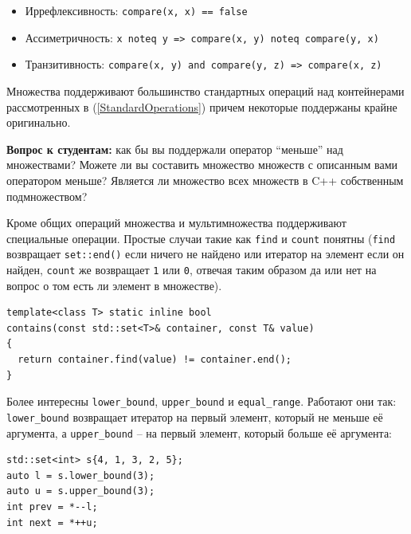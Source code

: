 \documentclass[a4paper,12pt,oneside]{article}
\newif\ifanswers
\begin{document}
\begin {itemize}
\item Иррефлексивность: \lstinline!compare(x, x) == false!
\item Ассиметричность: \lstinline!x noteq y => compare(x, y) noteq compare(y, x)!
\item Транзитивность: \lstinline!compare(x, y) and compare(y, z) => compare(x, z)!
\end {itemize}

Множества поддерживают большинство стандартных операций над контейнерами рассмотренных в (\ref{StandardOperations}) причем некоторые поддержаны крайне оригинально.

\textbf{Вопрос к студентам:} как бы вы поддержали оператор ``меньше'' над множествами? Можете ли вы составить множество множеств с описанным вами оператором меньше? Является ли множество всех множеств в C++ собственным подмножеством?

\ifanswers
Много вариантов на самом деле. Простейший -- сравнивать размер, если размер второго аргумента больше размера первого возвращать true, иначе false.

Такой экзотики как множество всех множеств в C++ не бывает благодаря тому что каждый уровень инстанцирования шаблона задает по сути фон-Неймановский класс.
\fi

Кроме общих операций множества и мультимножества поддерживают специальные операции. Простые случаи такие как \lstinline!find! и \lstinline!count! понятны (\lstinline!find! возвращает \lstinline!set::end()! если ничего не найдено или итератор на элемент если он найден, \lstinline!count! же возвращает \lstinline!1! или \lstinline!0!, отвечая таким образом да или нет на вопрос о том есть ли элемент в множестве).

\begin{lstlisting}
template<class T> static inline bool 
contains(const std::set<T>& container, const T& value)
{
  return container.find(value) != container.end();
}
\end{lstlisting}

Более интересны \lstinline!lower_bound!, \lstinline!upper_bound! и \lstinline!equal_range!. Работают они так: \lstinline!lower_bound! возвращает итератор на первый элемент, который не меньше её аргумента, а \lstinline!upper_bound! -- на первый элемент, который больше её аргумента:

\begin{lstlisting}
std::set<int> s{4, 1, 3, 2, 5};
auto l = s.lower_bound(3);
auto u = s.upper_bound(3);
int prev = *--l;
int next = *++u;
\end{lstlisting}
\end{document}
